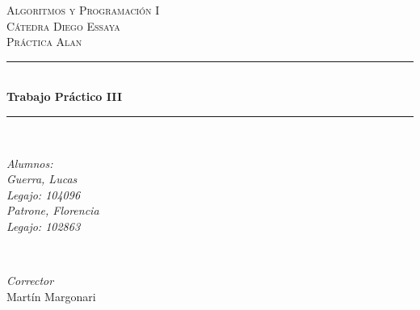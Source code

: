 \documentclass{article}
\begin{document}

\begin{titlepage} %
	\newcommand{\HRule}{\rule{\linewidth}{0.4mm}} %
	
	\center %
	
	
	\textsc{\Huge Algoritmos y Programaci\'on I}\\[2.5cm] %
	
	\textsc{\Large C\'atedra Diego Essaya}\\[0.8cm]  %
	
	\textsc{\large Pr\'actica Alan}\\[3.5cm] %
	
	
	\HRule\\[0.4cm]
	
	{\huge\bfseries Trabajo Pr\'actico III}\\[0.4cm] %
	
	\HRule\\[3.5cm]
	

	\begin{minipage}{0.4\textwidth}
		\begin{flushleft}
			\Large
			\textit{Alumnos:}\\[0.4cm] %
			\textit{Guerra, Lucas}\\
			\textit{Legajo: 104096}\\[0.2cm]
			
			\textit{Patrone, Florencia}\\
			\textit{Legajo: 102863}\\
		\end{flushleft}
	\end{minipage}
	~
	\begin{minipage}{0.4\textwidth}
		\begin{flushright}
			\Large
			\center \textit{Corrector}\\
			Mart\'in Margonari %
		\end{flushright}
	\end{minipage}
	

\end{titlepage}
\end{document}
